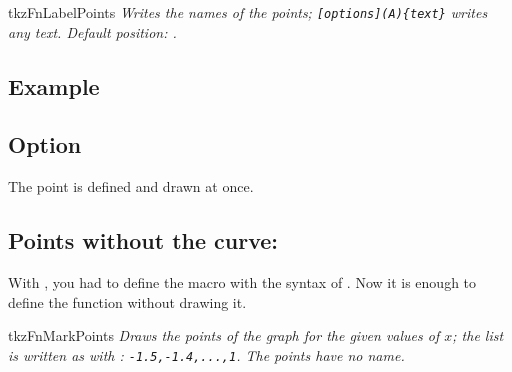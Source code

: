 \begin{NewMacroBox}{tkzFnLabelPoints}{}
\emph{Writes the names of the points; \texttt{[options](A)\{text\}} writes any text. Default position: .}
\end{NewMacroBox}

\subsection{Example}

\begin{center}
\begin{tkzexample}[vbox]
\end{tkzexample}
\end{center}

\subsection{Option }
The point is defined and drawn at once.

\begin{tkzexample}[latex=7cm,small]
\end{tkzexample}

\newpage
\subsection{Points without the curve: }

With , you had to define the macro  with the syntax of . Now it is enough to define the function without drawing it.

\begin{NewMacroBox}{tkzFnMarkPoints}{}
\emph{Draws the points of the graph for the given values of $x$; the list is written as with : \texttt{-1.5,-1.4,...,1}. The points have no name.}
\end{NewMacroBox}

